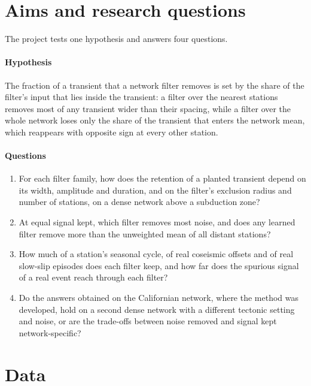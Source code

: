 \documentclass[preprint,12pt,authoryear]{elsarticle}
\begin{document}
\section{Aims and research questions}
\label{sec:aims}

The project tests one hypothesis and answers four questions.

\paragraph{Hypothesis} The fraction of a transient that a network filter removes is set by the share of the filter's input that lies inside the transient: a filter over the nearest stations removes most of any transient wider than their spacing, while a filter over the whole network loses only the share of the transient that enters the network mean, which reappears with opposite sign at every other station.

\paragraph{Questions}
\begin{enumerate}
  \item For each filter family, how does the retention of a planted transient depend on its width, amplitude and duration, and on the filter's exclusion radius and number of stations, on a dense network above a subduction zone?
  \item At equal signal kept, which filter removes most noise, and does any learned filter remove more than the unweighted mean of all distant stations?
  \item How much of a station's seasonal cycle, of real coseismic offsets and of real slow-slip episodes does each filter keep, and how far does the spurious signal of a real event reach through each filter?
  \item Do the answers obtained on the Californian network, where the method was developed, hold on a second dense network with a different tectonic setting and noise, or are the trade-offs between noise removed and signal kept network-specific?
\end{enumerate}

\section{Data}
\label{sec:data}
\end{document}
